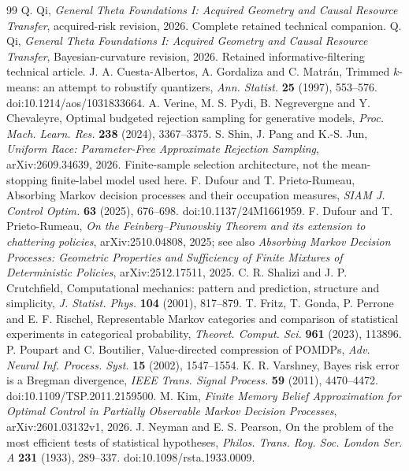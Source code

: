\begin{thebibliography}{99}
 Q. Qi, \emph{General Theta Foundations I: Acquired Geometry and Causal Resource Transfer}, acquired-risk revision, 2026. Complete retained technical companion.
 Q. Qi, \emph{General Theta Foundations I: Acquired Geometry and Causal Resource Transfer}, Bayesian-curvature revision, 2026. Retained informative-filtering technical article.
 J. A. Cuesta-Albertos, A. Gordaliza and C. Matr\'an, Trimmed $k$-means: an attempt to robustify quantizers, \emph{Ann. Statist.} \textbf{25} (1997), 553--576. doi:10.1214/aos/1031833664.
 A. Verine, M. S. Pydi, B. Negrevergne and Y. Chevaleyre, Optimal budgeted rejection sampling for generative models, \emph{Proc. Mach. Learn. Res.} \textbf{238} (2024), 3367--3375.
 S. Shin, J. Pang and K.-S. Jun, \emph{Uniform Race: Parameter-Free Approximate Rejection Sampling}, arXiv:2609.34639, 2026. Finite-sample selection architecture, not the mean-stopping finite-label model used here.
 F. Dufour and T. Prieto-Rumeau, Absorbing Markov decision processes and their occupation measures, \emph{SIAM J. Control Optim.} \textbf{63} (2025), 676--698. doi:10.1137/24M1661959.
 F. Dufour and T. Prieto-Rumeau, \emph{On the Feinberg--Piunovskiy Theorem and its extension to chattering policies}, arXiv:2510.04808, 2025; see also \emph{Absorbing Markov Decision Processes: Geometric Properties and Sufficiency of Finite Mixtures of Deterministic Policies}, arXiv:2512.17511, 2025.
 C. R. Shalizi and J. P. Crutchfield, Computational mechanics: pattern and prediction, structure and simplicity, \emph{J. Statist. Phys.} \textbf{104} (2001), 817--879.
 T. Fritz, T. Gonda, P. Perrone and E. F. Rischel, Representable Markov categories and comparison of statistical experiments in categorical probability, \emph{Theoret. Comput. Sci.} \textbf{961} (2023), 113896.
 P. Poupart and C. Boutilier, Value-directed compression of POMDPs, \emph{Adv. Neural Inf. Process. Syst.} \textbf{15} (2002), 1547--1554.
 K. R. Varshney, Bayes risk error is a Bregman divergence, \emph{IEEE Trans. Signal Process.} \textbf{59} (2011), 4470--4472. doi:10.1109/TSP.2011.2159500.
 M. Kim, \emph{Finite Memory Belief Approximation for Optimal Control in Partially Observable Markov Decision Processes}, arXiv:2601.03132v1, 2026.
 J. Neyman and E. S. Pearson, On the problem of the most efficient tests of statistical hypotheses, \emph{Philos. Trans. Roy. Soc. London Ser. A} \textbf{231} (1933), 289--337. doi:10.1098/rsta.1933.0009.
\end{thebibliography}

